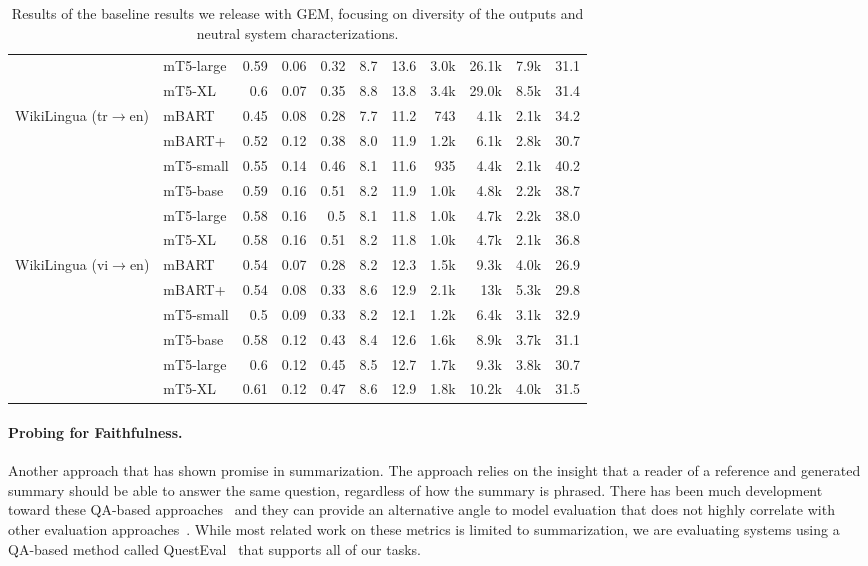 \documentclass[11pt,a4paper]{article}
\newcommand{\GEM}{\textsc{GEM}}
\begin{document}
\begin{table*}[!htbp]
\begin{tabular}{@{}llrrrrrrrrr@{}}
 & \small{mT5-large} & 0.59 & 0.06 & 0.32 & 8.7 & 13.6 & 3.0k & 26.1k & 7.9k & 31.1 \\
 & \small{mT5-XL} & 0.6 & 0.07 & 0.35 & 8.8 & 13.8 & 3.4k & 29.0k & 8.5k & 31.4 \\
\multirow{2}{*}{WikiLingua (tr$\rightarrow$en)} & \small{mBART} & 0.45 & 0.08 & 0.28 & 7.7 & 11.2 & 743 & 4.1k & 2.1k & 34.2 \\
 & \small{mBART+} & 0.52 & 0.12 & 0.38 & 8.0 & 11.9 & 1.2k & 6.1k & 2.8k & 30.7 \\
  & \small{mT5-small} & 0.55 & 0.14 & 0.46 & 8.1 & 11.6 & 935 & 4.4k & 2.1k & 40.2 \\
 & \small{mT5-base} & 0.59 & 0.16 & 0.51 & 8.2 & 11.9 & 1.0k & 4.8k & 2.2k & 38.7 \\
 & \small{mT5-large} & 0.58 & 0.16 & 0.5 & 8.1 & 11.8 & 1.0k & 4.7k & 2.2k & 38.0 \\
 & \small{mT5-XL} & 0.58 & 0.16 & 0.51 & 8.2 & 11.8 & 1.0k & 4.7k & 2.1k & 36.8 \\
\multirow{2}{*}{WikiLingua (vi$\rightarrow$en)} & \small{mBART} & 0.54 & 0.07 & 0.28 & 8.2 & 12.3 & 1.5k & 9.3k & 4.0k & 26.9  \\
 & \small{mBART+} & 0.54 & 0.08 & 0.33 & 8.6 & 12.9 & 2.1k  & 13k & 5.3k & 29.8 \\
 & \small{mT5-small} & 0.5 & 0.09 & 0.33 & 8.2 & 12.1 & 1.2k & 6.4k & 3.1k & 32.9 \\
 & \small{mT5-base} & 0.58 & 0.12 & 0.43 & 8.4 & 12.6 & 1.6k & 8.9k & 3.7k & 31.1 \\
 & \small{mT5-large} & 0.6 & 0.12 & 0.45 & 8.5 & 12.7 & 1.7k & 9.3k & 3.8k & 30.7 \\
 & \small{mT5-XL} & 0.61 & 0.12 & 0.47 & 8.6 & 12.9 & 1.8k & 10.2k & 4.0k & 31.5 \\
\bottomrule
\end{tabular}
\caption{Results of the baseline results we release with \GEM, focusing on diversity of the outputs and neutral system characterizations.}
\label{tab:result2}
\end{table*}

\paragraph{Probing for Faithfulness.} Another approach that has shown promise in summarization. The approach relies on the insight that a reader of a reference and generated summary should be able to answer the same question, regardless of how the summary is phrased. There has been much development toward these QA-based approaches~\citep[][among others]{eyal2019question,scialom-2019-answers,durmus-2020-feqa,wang-2020-asking} and they can provide an alternative angle to model evaluation that does not highly correlate with other evaluation approaches~\citep{fabbri2020summeval}. While most related work on these metrics is limited to summarization, we are evaluating systems using a QA-based method called QuestEval~\citep{scialom2020SAFEval} that supports all of our tasks. 
\end{document}
